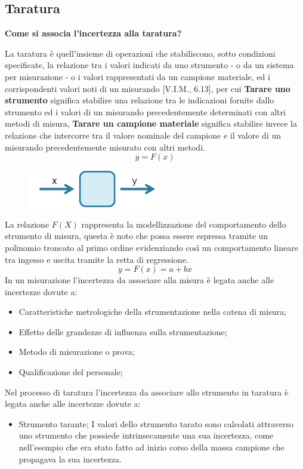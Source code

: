 \documentclass[a4paper, 15pt]{article}
\begin{document}
\subsection{Taratura}
\begin{adjustwidth}{2in}{}   	
\textbf{Come si associa l'incertezza alla taratura? }
   		
   		La taratura è quell'insieme di operazioni che stabiliscono, sotto condizioni specificate, la
   		relazione tra i valori indicati da uno strumento - o da un sistema per
   		misurazione - o i valori rappresentati da un campione materiale, ed i
   		corrispondenti valori noti di un misurando [V.I.M., 6.13], per cui \textbf{Tarare uno strumento} significa stabilire una relazione tra le indicazioni
   		fornite dallo strumento ed i valori di un misurando precedentemente determinati con altri metodi di misura, \textbf{Tarare un campione materiale} significa stabilire invece la relazione che intercorre
   		tra il valore nominale del campione e il valore di un misurando
   		precedentemente misurato con altri metodi. 
   		\[y = F(x)\]   		
   		\begin{figure}[H]
   			\centering
   			\includegraphics[width=0.2\linewidth]{fig/screenshot012}
   			\label{fig:screenshot012}
   		\end{figure}   		
   		La relazione $F(X)$ rappresenta la modellizzazione del comportamento dello strumento di misura, questa è noto che possa essere espressa tramite un polinomio troncato al primo ordine evidenziando così un comportamento lineare tra ingesso e uscita tramite la retta di regressione. 
   		\[y = F(x) = a+bx\] 		
   		In un misurazione l’incertezza da associare alla misura è legata anche alle
   		incertezze dovute a:
   		\begin{itemize}
   			\item Caratteristiche metrologiche della strumentazione nella catena di misura;
   			\item Effetto delle grandezze di influenza sulla strumentazione;
   			\item Metodo di misurazione o prova;
   			\item Qualificazione del personale;
   		\end{itemize}
\newpage
   		Nel processo di taratura l’incertezza da associare allo strumento in taratura è
   		legata anche alle incertezze dovute a:
   		\begin{itemize}
   			\item Strumento tarante;\newline 
   			I valori dello strumento tarato sono calcolati attraverso uno strumento che possiede intrinsecamente una sua incertezza, come nell'esempio che era stato fatto ad inizio corso della massa campione che propagava la sua incertezza.
   			

\end{itemize}
\end{adjustwidth}
\end{document}
